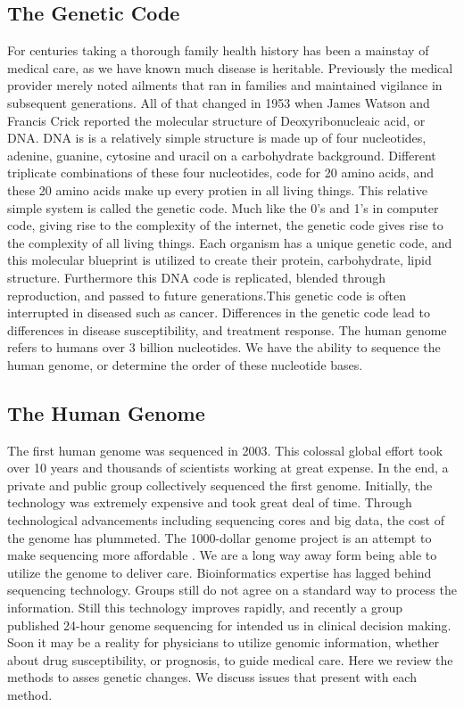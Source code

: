 \documentclass[sigconf]{acmart}
\begin{document}
\subsection{The Genetic Code}
For centuries taking a thorough family health history has been a mainstay of medical care, as we have known much disease is heritable.  Previously the medical provider merely noted ailments that ran in families and maintained vigilance in subsequent generations.  All of that changed in 1953 when James Watson and Francis Crick reported the molecular structure of Deoxyribonucleaic acid, or DNA.  DNA is is a relatively simple structure is made up of four nucleotides, adenine, guanine, cytosine and uracil on a carbohydrate background. Different triplicate combinations of these four nucleotides, code for 20 amino acids, and these 20 amino acids make up every protien in all living things.  This relative simple system is called the genetic code.  Much like the 0's and 1's in computer code, giving rise to the complexity of the internet, the genetic code gives rise to the complexity of all living things.  Each organism has a unique genetic code, and this molecular blueprint is utilized  to create their protein, carbohydrate, lipid structure.  Furthermore this DNA code is replicated, blended through reproduction, and passed to future generations.This genetic code is often interrupted in diseased such as cancer.  Differences in the genetic code lead to differences in disease susceptibility, and treatment response.    The human genome refers to humans over 3 billion nucleotides.  We have the ability to sequence the human genome, or determine the order of these nucleotide bases. 

\subsection{The Human Genome}
    The first human genome was sequenced in 2003\cite{collins2003human}.  This colossal global
effort took over 10 years and thousands of scientists working at great
expense.  In the end, a private and public group collectively
sequenced the first genome.  Initially, the technology was extremely
expensive and took great deal of time.  Through technological
advancements including sequencing cores and big data, the cost of the
genome has plummeted.  The 1000-dollar genome project is an attempt to
make sequencing more affordable \cite{fox6}.  We are a long way away form
being able to utilize the genome to deliver care.  Bioinformatics
expertise has lagged behind sequencing technology.  Groups still do not agree on
a standard way to process the information.  Still this technology
improves rapidly, and recently a group published 24-hour genome
sequencing for intended us in clinical decision making. Soon it may be
a reality for physicians to utilize genomic information, whether about
drug susceptibility, or prognosis, to guide medical care.  Here we review the methods to asses genetic changes.  We discuss issues that present with each method.  
\end{document}
